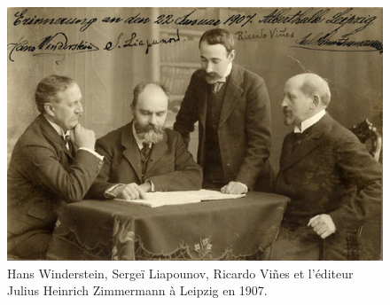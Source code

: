 \begin{figure}[!ht]
  \begin{bigcenter}
    \includegraphics[width=14cm, keepaspectratio]{lyapunov-3.jpg}
  \end{bigcenter}
  \caption{Hans Winderstein, Sergeï Liapounov, Ricardo Viñes et l'éditeur Julius Heinrich Zimmermann à Leipzig en 1907.}
\end{figure}


